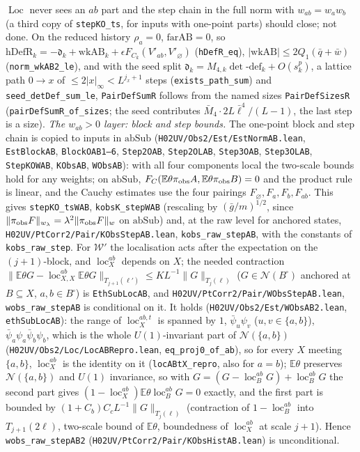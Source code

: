 \documentclass[11pt]{amsart}
\theoremstyle{definition}
\theoremstyle{remark}
\numberwithin{equation}{section}
\begin{document}
$\operatorname{Loc}$ never sees an $ab$ part and the step chain in the full norm with $w_{ab}=w_aw_b$ (a third copy of \texttt{stepKO\_ts}, for inputs with one-point parts) should close; not done. On the reduced history $\rho_a=0$, $\mathrm{farAB}=0$, so $\mathrm{hDefR}_k=-\mathfrak d_k+\mathrm{wkAB}_k+\epsilon F_{C_k}(V'_{ab},V'_\varnothing)$ (\texttt{hDefR\_eq}), $|\mathrm{wkAB}|\le2Q_1(\bar q+\bar w)$ (\texttt{norm\_wkAB2\_le}), and with the seed split $\mathfrak d_k=M_{4,k}\det\text{-}\mathrm{def}_k+O(s^p_k)$, a lattice path $0\to x$ of $\le2|x|_\infty<L^{j_x+1}$ steps (\texttt{exists\_path\_sum}) and \texttt{seed\_detDef\_sum\_le}, \texttt{PairDefSumR} follows from the named sizes \texttt{PairDefSizesR} (\texttt{pairDefSumR\_of\_sizes}; the seed contributes $\bar M_4\cdot2L\bar\ell^4/(L-1)$, the last step is a size). \emph{The $w_{ab}>0$ layer: block and step bounds.} The one-point block and step chain is copied to inputs in $\mathrm{abSub}$ (\texttt{H02UV/Obs2/Est/EstNormAB.lean}, \texttt{EstBlockAB}, \texttt{BlockOAB1--6}, \texttt{Step2OAB}, \texttt{Step2OLAB}, \texttt{Step3OAB}, \texttt{Step3OLAB}, \texttt{StepKOWAB}, \texttt{KObsAB}, \texttt{WObsAB}): with all four components local the two-scale bounds hold for any weights; on $\mathrm{abSub}$, $F_C(\mathbb E\theta\pi_{\rm obs}A,\mathbb E\theta\pi_{\rm obs}B)=0$ and the product rule is linear, and the Cauchy estimates use the four pairings $F_\varnothing,F_a,F_b,F_{ab}$. This gives \texttt{stepKO\_tsWAB}, \texttt{kobsK\_stepWAB} (rescaling by $(\bar g/m)^{1/2}$, since $\|\pi_{\rm obs}F\|_{w_\lambda}=\lambda^2\|\pi_{\rm obs}F\|_w$ on $\mathrm{abSub}$) and, at the raw level for anchored states, \texttt{H02UV/PtCorr2/Pair/KObsStepAB.lean}, \texttt{kobs\_raw\_stepAB}, with the constants of \texttt{kobs\_raw\_step}. For $\mathcal W'$ the localisation acts after the expectation on the $(j+1)$-block, and $\operatorname{loc}^{ab}_X$ depends on $X$; the needed contraction $\|\mathbb E\theta G-\operatorname{loc}^{ab}_{X,X}\mathbb E\theta G\|_{T_{j+1}(\ell')}\le KL^{-1}\|G\|_{T_j(\ell)}$ ($G\in\mathcal N(B^\square)$ anchored at $B\subseteq X$, $a,b\in B^\square$) is \texttt{EthSubLocAB}, and \texttt{H02UV/PtCorr2/Pair/WObsStepAB.lean}, \texttt{wobs\_raw\_stepAB} is conditional on it. It holds (\texttt{H02UV/Obs2/Est/WObsAB2.lean}, \texttt{ethSubLocAB}): the range of $\operatorname{loc}^{ab,t}_X$ is spanned by $1$, $\bar\psi_u\psi_v$ ($u,v\in\{a,b\}$), $\bar\psi_a\psi_a\bar\psi_b\psi_b$, which is the whole $U(1)$-invariant part of $\mathcal N(\{a,b\})$ (\texttt{H02UV/Obs2/Loc/LocABRepro.lean}, \texttt{eq\_proj0\_of\_ab}), so for every $X$ meeting $\{a,b\}$, $\operatorname{loc}^{ab}_X$ is the identity on it (\texttt{locABtX\_repro}, also for $a=b$); $\mathbb E\theta$ preserves $\mathcal N(\{a,b\})$ and $U(1)$ invariance, so with $G=(G-\operatorname{loc}^{ab}_BG)+\operatorname{loc}^{ab}_BG$ the second part gives $(1-\operatorname{loc}^{ab}_X)\mathbb E\theta\operatorname{loc}^{ab}_BG=0$ exactly, and the first part is bounded by $(1+C_b)C_cL^{-1}\|G\|_{T_j(\ell)}$ (contraction of $1-\operatorname{loc}^{ab}_B$ into $T_{j+1}(2\ell)$, two-scale bound of $\mathbb E\theta$, boundedness of $\operatorname{loc}^{ab}_X$ at scale $j+1$). Hence \texttt{wobs\_raw\_stepAB2} (\texttt{H02UV/PtCorr2/Pair/KObsHistAB.lean}) is unconditional. 
\end{document}
